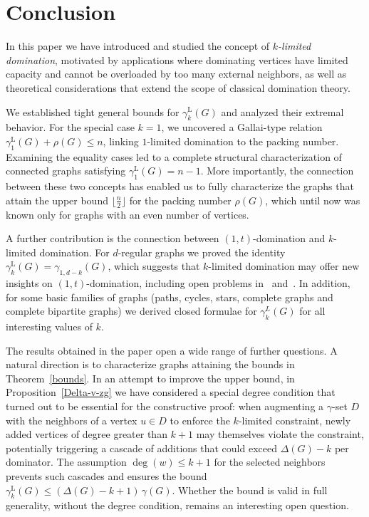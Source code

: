 \documentclass[11pt]{article}
\newcommand{\gammakL}{\gamma_k^{\mathrm L}}
\begin{document}
\section{Conclusion}



In this paper we have introduced and studied the concept of \emph{$k$-limited domination}, motivated by applications where dominating vertices have limited capacity and cannot be overloaded by too many external neighbors, as well  as theoretical considerations that extend the scope 
of classical domination theory.


We established tight general bounds for $\gamma^{\mathrm L}_k(G)$ and analyzed their 
extremal behavior. For the special case $k=1$, we uncovered a Gallai-type relation 
$\gamma^{\mathrm L}_1(G)+\rho(G)\le n$, linking $1$-limited domination to the packing number. Examining the equality cases led to a complete structural 
characterization of connected graphs satisfying $\gamma^{\mathrm L}_1(G)=n-1$.
More importantly, the connection between these two concepts has enabled us to fully characterize the graphs that attain the upper bound $\lfloor \frac{n}{2} \rfloor$ for the packing number $\rho(G)$, which until now was known only for graphs with an even number of vertices.

A further contribution is the connection between $(1,t)$-domination and $k$-limited domination. 
For $d$-regular graphs we proved the identity
$\gamma^{\mathrm L}_k(G)=\gamma_{1,d-k}(G)$,
which suggests that 
$k$-limited domination may offer new insights on
$(1,t)$-domination, including open problems in~\cite{trilobiti} and~\cite{fakhran}.
In addition, for some basic families of graphs (paths, cycles, stars, complete graphs and complete bipartite graphs) we derived closed formulae for $\gamma^L_k(G)$ for all interesting values of $k$. 

The results obtained in the paper open a wide range of further questions. A natural direction 
is to characterize graphs attaining the bounds in Theorem~\ref{bounds}.
In an attempt to improve the upper bound, in Proposition~\ref{Delta-v-zg} we have considered 
a special degree condition that turned out to be essential
for the constructive proof:
when augmenting a $\gamma$-set $D$ with the neighbors of a vertex $u\in D$ to enforce the
$k$-limited constraint, newly added vertices of degree greater than $k+1$ may themselves violate
the constraint, potentially triggering a cascade of additions that could exceed $\Delta(G)-k$
per dominator. The assumption $\deg(w)\le k+1$ for the selected neighbors prevents
such cascades and ensures the bound 
$\gammakL(G) \le (\Delta(G)-k+1)\,\gamma(G)$.
Whether the bound is valid in full generality, without the degree condition, remains an interesting open question.
\end{document}
